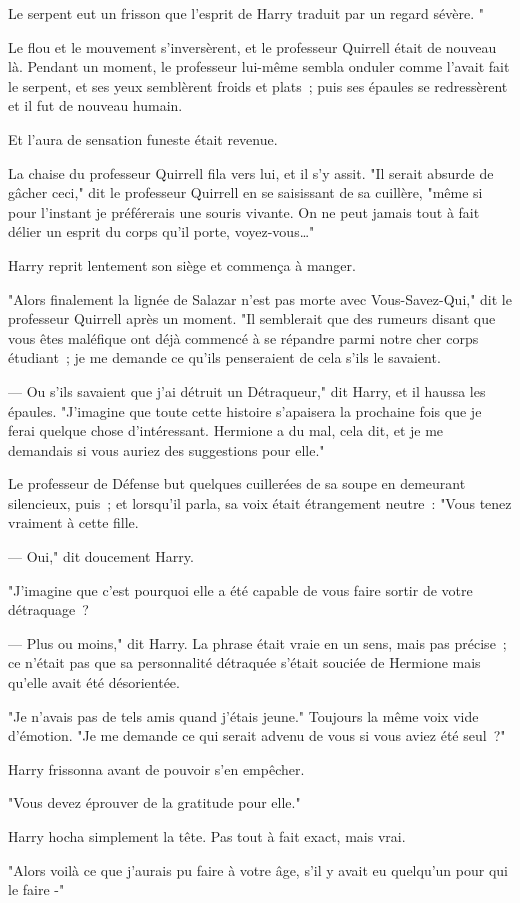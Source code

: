 Le serpent eut un frisson que l'esprit de Harry traduit par un regard sévère. "

Le flou et le mouvement s'inversèrent, et le professeur Quirrell était de nouveau là. Pendant un moment, le professeur lui-même sembla onduler comme l'avait fait le serpent, et ses yeux semblèrent froids et plats~; puis ses épaules se redressèrent et il fut de nouveau humain.

Et l'aura de sensation funeste était revenue.

La chaise du professeur Quirrell fila vers lui, et il s'y assit. "Il serait absurde de gâcher ceci," dit le professeur Quirrell en se saisissant de sa cuillère, "même si pour l'instant je préférerais une souris vivante. On ne peut jamais tout à fait délier un esprit du corps qu'il porte, voyez-vous…"

Harry reprit lentement son siège et commença à manger.

\later

"Alors finalement la lignée de Salazar n'est pas morte avec Vous-Savez-Qui," dit le professeur Quirrell après un moment. "Il semblerait que des rumeurs disant que vous êtes maléfique ont déjà commencé à se répandre parmi notre cher corps étudiant~; je me demande ce qu'ils penseraient de cela s'ils le savaient.

--- Ou s'ils savaient que j'ai détruit un Détraqueur," dit Harry, et il haussa les épaules. "J'imagine que toute cette histoire s'apaisera la prochaine fois que je ferai quelque chose d'intéressant. Hermione a du mal, cela dit, et je me demandais si vous auriez des suggestions pour elle."

Le professeur de Défense but quelques cuillerées de sa soupe en demeurant silencieux, puis~; et lorsqu'il parla, sa voix était étrangement neutre~: "Vous tenez vraiment à cette fille.

--- Oui," dit doucement Harry.

"J'imagine que c'est pourquoi elle a été capable de vous faire sortir de votre détraquage~?

--- Plus ou moins," dit Harry. La phrase était vraie en un sens, mais pas précise~; ce n'était pas que sa personnalité détraquée s'était souciée de Hermione mais qu'elle avait été désorientée.

"Je n'avais pas de tels amis quand j'étais jeune." Toujours la même voix vide d'émotion. "Je me demande ce qui serait advenu de vous si vous aviez été seul~?"

Harry frissonna avant de pouvoir s'en empêcher.

"Vous devez éprouver de la gratitude pour elle."

Harry hocha simplement la tête. Pas tout à fait exact, mais vrai.

"Alors voilà ce que j'aurais pu faire à votre âge, s'il y avait eu quelqu'un pour qui le faire -" 

